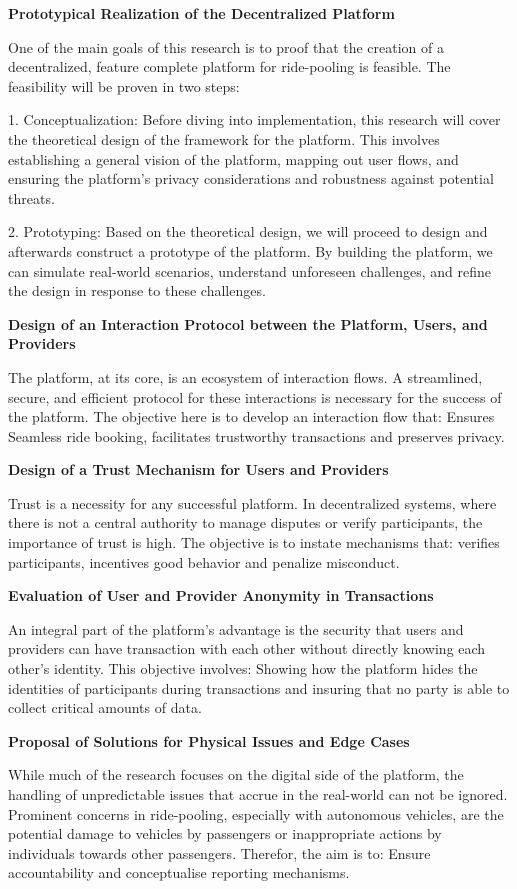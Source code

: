 \textbf{Prototypical Realization of the Decentralized Platform}

One of the main goals of this research is to proof that the creation of a decentralized, feature complete platform for ride-pooling is feasible.  The feasibility will be proven in two steps:

1. Conceptualization: Before diving into implementation, this research will cover the theoretical design of the framework for the platform. This involves establishing a general vision of the platform, mapping out user flows, and ensuring the platform's privacy considerations and robustness against potential threats.

2. Prototyping: Based on the theoretical design, we will proceed to design and afterwards construct a prototype of the platform. By building the platform,  we can simulate real-world scenarios, understand unforeseen challenges, and refine the design in response to these challenges.


\textbf{Design of an Interaction Protocol between the Platform, Users, and Providers}

The platform, at its core, is an ecosystem of interaction flows.  A streamlined, secure, and efficient protocol for these interactions is necessary for the success of the platform. The objective here is to develop an interaction flow that: Ensures Seamless ride booking, facilitates trustworthy transactions and preserves privacy.


\textbf{Design of a Trust Mechanism for Users and Providers}

Trust is a necessity for any successful platform. In decentralized systems, where there is not a central authority to manage disputes or verify participants, the importance of trust is high. The objective is to instate mechanisms that: verifies participants, incentives good behavior and penalize misconduct.


\textbf{Evaluation of User and Provider Anonymity in Transactions}

An integral part of the platform's advantage is the security that users and providers can have transaction with each other without directly knowing each other's identity. This objective involves:
Showing how the platform hides the identities of participants during transactions and insuring that no party is able to collect critical amounts of data.


\textbf{Proposal of Solutions for Physical Issues and Edge Cases}

While much of the research focuses on the digital side of the platform, the handling of unpredictable issues that accrue in the real-world can not be ignored. Prominent concerns in ride-pooling, especially with autonomous vehicles, are the potential damage to vehicles by passengers or inappropriate actions by individuals towards other passengers. Therefor, the aim is to: Ensure accountability and conceptualise reporting mechanisms.
